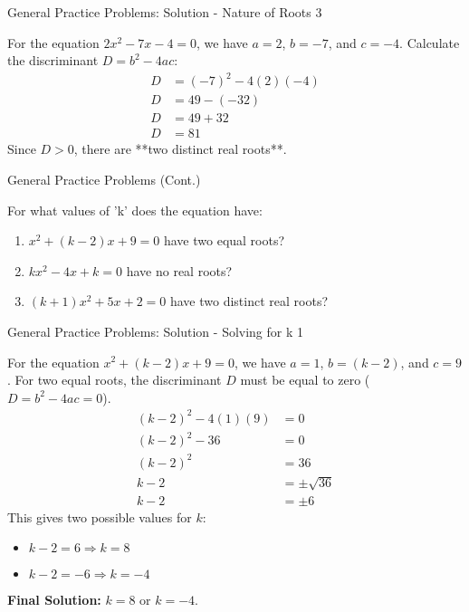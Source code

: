 \documentclass[aspectratio=169]{beamer}
\begin{document}
\begin{frame}{General Practice Problems: Solution - Nature of Roots 3}
    \begin{tcolorbox}[colback=lightgray,colframe=accent,title=Solution: $2x^2 - 7x - 4 = 0$]
        \footnotesize
        For the equation $2x^2 - 7x - 4 = 0$, we have $a=2$, $b=-7$, and $c=-4$.
        Calculate the discriminant $D = b^2 - 4ac$:
        \begin{align*}
            D &= (-7)^2 - 4(2)(-4) \\
            D &= 49 - (-32) \\
            D &= 49 + 32 \\
            D &= 81
        \end{align*}
        Since $D>0$, there are **two distinct real roots**.
    \end{tcolorbox}
\end{frame}

\begin{frame}{General Practice Problems (Cont.)}
    \begin{tcolorbox}[colback=lightgray,colframe=primary,title=Solving for k]
        \footnotesize
        For what values of 'k' does the equation have:
        \begin{enumerate}
            \item $x^2 + (k-2)x + 9 = 0$ have two equal roots?
            \item $kx^2 - 4x + k = 0$ have no real roots?
            \item $(k+1)x^2 + 5x + 2 = 0$ have two distinct real roots?
        \end{enumerate}
    \end{tcolorbox}
\end{frame}

\begin{frame}{General Practice Problems: Solution - Solving for k 1}
    \begin{tcolorbox}[colback=lightgray,colframe=accent,title=Solution: $x^2 + (k-2)x + 9 = 0$ (Two Equal Roots)]
        \footnotesize
        For the equation $x^2 + (k-2)x + 9 = 0$, we have $a=1$, $b=(k-2)$, and $c=9$.
        For two equal roots, the discriminant $D$ must be equal to zero ($D=b^2-4ac=0$).
        \begin{align*}
            (k-2)^2 - 4(1)(9) &= 0 \\
            (k-2)^2 - 36 &= 0 \\
            (k-2)^2 &= 36 \\
            k-2 &= \pm\sqrt{36} \\
            k-2 &= \pm 6
        \end{align*}
        This gives two possible values for $k$:
        \begin{itemize}
            \item $k-2 = 6 \Rightarrow k = 8$
            \item $k-2 = -6 \Rightarrow k = -4$
        \end{itemize}
        \textbf{Final Solution:} $k=8$ or $k=-4$.
    \end{tcolorbox}
\end{frame}
\end{document}
